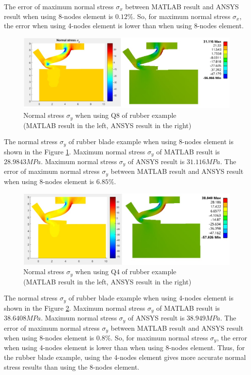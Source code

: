 The error of maximum normal stress $\sigma_x$ between MATLAB result and ANSYS result when using 8-nodes element is $0.12\%$.
So, for maximum normal stress $\sigma_x$, the error when using 4-nodes element is lower than when using 8-nodes element.
\newpage
\begin{figure}[H]
    \centering
    \includegraphics[scale=0.65]{Figures/sy_rub_MvsA.jpg}
    \decoRule
    \caption{Normal stress $\sigma_y$ when using Q8 of rubber example \\
    (MATLAB result in the left, ANSYS result in the right)}
    \label{fig:sy_rub_MandA_5}
\end{figure}
\noindent
The normal stress $\sigma_y$ of rubber blade example when using 8-nodes element is shown in the Figure \ref{fig:sy_rub_MandA_5}.
Maximum normal stress $\sigma_y$ of MATLAB result is $28.9843 MPa$.
Maximum normal stress $\sigma_y$ of ANSYS result is $31.116 MPa$.
The error of maximum normal stress $\sigma_y$ between MATLAB result and ANSYS result when using 8-nodes element is $6.85\%$.
\newline
\begin{figure}[H]
    \centering
    \includegraphics[scale=0.64]{Figures/chapter5/sy_q4_r.jpg}
    \decoRule
    \caption{Normal stress $\sigma_y$ when using Q4 of rubber example \\
    (MATLAB result in the left, ANSYS result in the right)}
    \label{fig:sy_q4_r}
\end{figure}
\noindent
The normal stress $\sigma_y$ of rubber blade example when using 4-nodes element is shown in the Figure \ref{fig:sy_q4_r}.
Maximum normal stress $\sigma_y$ of MATLAB result is $38.6408 MPa$.
Maximum normal stress $\sigma_y$ of ANSYS result is $38.949 MPa$.
The error of maximum normal stress $\sigma_y$ between MATLAB result and ANSYS result when using 8-nodes element is $0.8\%$.
So,  for maximum normal stress $\sigma_y$, the error when using 4-nodes element is lower than when using 8-nodes element.
\vspace{0.38cm}
\newline
Thus, for the rubber blade example, using the 4-nodes element gives more accurate normal stress results than using the 8-nodes element.
\newpage
